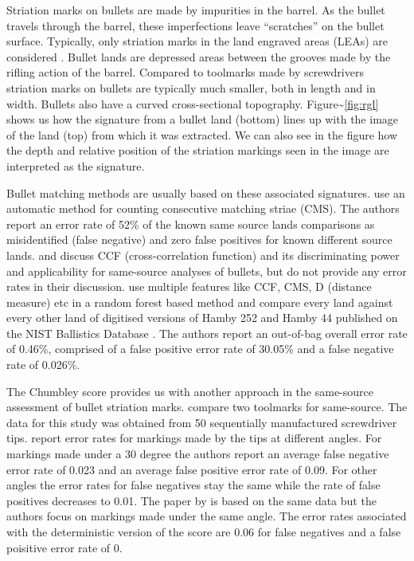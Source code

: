 \documentclass[12pt]{article}
\begin{document}
Striation marks on bullets are made by impurities in the barrel. As the
bullet travels through the barrel, these imperfections leave
``scratches'' on the bullet surface. Typically, only striation marks in
the land engraved areas (LEAs) are considered \citet{afte-article1992}.
Bullet lands are depressed areas between the grooves made by the rifling
action of the barrel. Compared to toolmarks made by screwdrivers
striation marks on bullets are typically much smaller, both in length
and in width. Bullets also have a curved cross-sectional topography.
Figure\textasciitilde{}\ref{fig:rgl} shows us how the signature from a
bullet land (bottom) lines up with the image of the land (top) from
which it was extracted. We can also see in the figure how the depth and
relative position of the striation markings seen in the image are
interpreted as the signature.

Bullet matching methods are usually based on these associated
signatures. \citet{chu2013} use an automatic method for counting
consecutive matching striae (CMS). The authors report an error rate of
52\% of the known same source lands comparisons as misidentified (false
negative) and zero false positives for known different source lands.
\citet{ma2004} and \citet{vorburger2011} discuss CCF (cross-correlation
function) and its discriminating power and applicability for same-source
analyses of bullets, but do not provide any error rates in their
discussion. \citet{aoas} use multiple features like CCF, CMS, D
(distance measure) etc in a random forest based method and compare every
land against every other land of digitised versions of Hamby 252 and
Hamby 44 \citep{hamby} published on the NIST Ballistics Database
\citep{nist}. The authors report an out-of-bag overall error rate of
0.46\%, comprised of a false positive error rate of 30.05\% and a false
negative rate of 0.026\%.

The Chumbley score provides us with another approach in the same-source
assessment of bullet striation marks. \citet{chumbley} compare two
toolmarks for same-source. The data for this study was obtained from 50
sequentially manufactured screwdriver tips. \citet{chumbley} report
error rates for markings made by the tips at different angles. For
markings made under a 30 degree the authors report an average false
negative error rate of 0.023 and an average false positive error rate of
0.09. For other angles the error rates for false negatives stay the same
while the rate of false positives decreases to 0.01.
 The paper by \citet{hadler} is based on the
same data but the authors focus on markings made under the same angle.
The error rates associated with the deterministic version of the score
are 0.06 for false negatives and a false poisitive error rate of 0.
\end{document}

